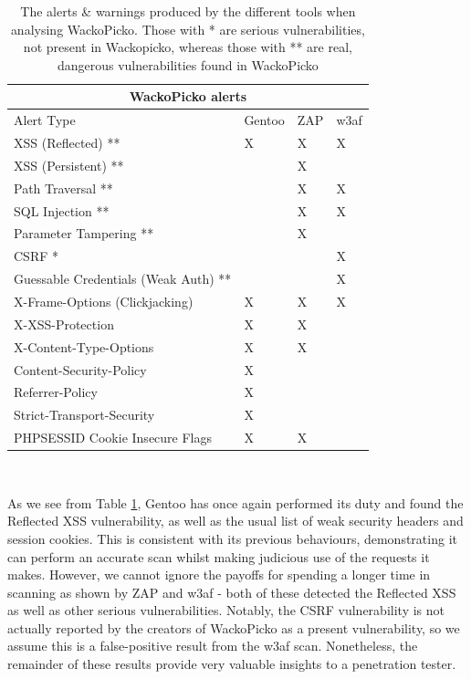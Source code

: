 \begin{table}[h]
	
	{
		
		\captionsetup{justification=centering}
		
		\caption{The alerts \& warnings produced by the different tools when analysing WackoPicko. Those with * are serious vulnerabilities, not present in Wackopicko, whereas those with ** are real, dangerous vulnerabilities found in WackoPicko}
		\label{table:wackopicko_alerts}
		\begin{tabular}{ |p{7cm}|>{\centering\arraybackslash}m{2cm} |>{\centering\arraybackslash}m{2cm} |>{\centering\arraybackslash}m{2cm}| }
			\hline
			\multicolumn{4}{|c|}{\textbf{WackoPicko alerts}} \\ [0.5ex]
			\hline \hline 
			Alert Type & Gentoo & ZAP & w3af \\
			\hline
			XSS (Reflected) ** & X & X & X\\
			XSS (Persistent) ** &  & X & \\
			Path Traversal ** &  & X & X\\
			SQL Injection **& & X & X\\
			Parameter Tampering ** &  & X & \\
			CSRF * & & & X \\
			Guessable Credentials (Weak Auth) ** & & & X \\
			X-Frame-Options (Clickjacking) & X & X & X \\
			X-XSS-Protection & X & X & \\
			X-Content-Type-Options& X & X & \\
			Content-Security-Policy & X & &\\
			Referrer-Policy & X & & \\
			Strict-Transport-Security & X  & & \\
			PHPSESSID Cookie Insecure Flags & X & X &  \\
			\hline
		\end{tabular}
	} \\
\end{table}

As we see from Table \ref{table:wackopicko_alerts}, Gentoo has once again performed its duty and found the Reflected XSS vulnerability, as well as the usual list of weak security headers and session cookies. This is consistent with its previous behaviours, demonstrating it can perform an accurate scan whilst making judicious use of the requests it makes. However, we cannot ignore the payoffs for spending a longer time in scanning as shown by ZAP and w3af - both of these detected the Reflected XSS as well as other serious vulnerabilities. Notably, the CSRF vulnerability is not actually reported by the creators of WackoPicko as a present vulnerability, so we assume this is a false-positive result from the w3af scan. Nonetheless, the remainder of these results  provide very valuable insights to a penetration tester. \\

